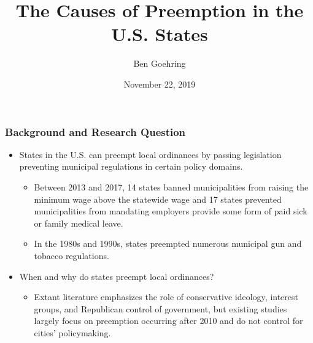 \documentclass{beamer}
\title{The Causes of Preemption in the U.S. States}
\author{Ben Goehring}
\date{November 22, 2019}
\begin{document}
\begin{frame}
\titlepage
\end{frame}


\begin{frame}
\frametitle{Background and Research Question}

\begin{itemize}
\item States in the U.S. can preempt local ordinances by passing legislation preventing municipal regulations in certain policy domains.
\begin{itemize}
	\item Between 2013 and 2017, 14 states banned municipalities from raising the minimum wage above the statewide wage and 17 states prevented municipalities from mandating employers provide some form of paid sick or family medical leave.
	\item In the 1980s and 1990s, states preempted numerous municipal gun and tobacco regulations.
\end{itemize}
\item When and why do states preempt local ordinances? 
\begin{itemize}
	\item Extant literature emphasizes the role of conservative ideology, interest groups, and Republican control of government, but existing studies largely focus on preemption occurring after 2010 and do not control for cities' policymaking.
\end{itemize}
\end{itemize}
\end{frame}
\end{document}
